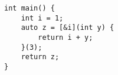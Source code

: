 \begin{lstlisting}[title=\href{https://godbolt.org/z/xazquF}{\texttt{godbolt.org/z/xazquF}}]
int main() {
    int i = 1;
    auto z = [&i](int y) {
        return i + y;
    }(3);
    return z;
}
\end{lstlisting}

